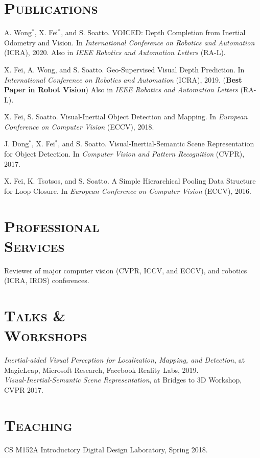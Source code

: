 \documentclass[margin, line, 10pt]{res} %
\begin{document}
\begin{resume}
\section{\textsc{Publications}}

\begin{enumerate}[label={[\bf\arabic*]},leftmargin=*]
\item
A. Wong$^*$, X. Fei$^*$, and S. Soatto. VOICED: Depth Completion from Inertial Odometry and Vision.
In \textit{International Conference on Robotics and Automation} (ICRA), 2020. Also in \textit{IEEE Robotics and Automation Letters} (RA-L).
\item 
X. Fei, A. Wong, and S. Soatto. Geo-Supervised Visual Depth Prediction. 
In \textit{International Conference on Robotics and Automation} (ICRA), 2019. 
(\textbf{Best Paper in Robot Vision})
Also in \textit{IEEE Robotics and Automation Letters} (RA-L).
\item 
X. Fei, S. Soatto. Visual-Inertial Object Detection and Mapping. 
In \textit{European Conference on Computer Vision} (ECCV), 2018.
\item 
J. Dong$^*$, X. Fei$^*$, and S. Soatto. Visual-Inertial-Semantic Scene Representation for Object Detection. 
In \textit{Computer Vision and Pattern Recognition} (CVPR), 2017.
\item 
X. Fei, K. Tsotsos, and S. Soatto. A Simple Hierarchical Pooling Data Structure for Loop Closure. 
In \textit{European Conference on Computer Vision} (ECCV), 2016.
\end{enumerate}

\section{\textsc{Professional\\Services}}
Reviewer of major computer vision (CVPR, ICCV, and ECCV), and robotics (ICRA, IROS) conferences.

\section{\textsc{Talks \&\\Workshops}}
\textit{Inertial-aided Visual Perception for Localization, Mapping, and Detection}, at MagicLeap, Microsoft Research, Facebook Reality Labs, 2019.\\
\textit{Visual-Inertial-Semantic Scene Representation}, at Bridges to 3D Workshop, CVPR 2017.

\section{\textsc{Teaching}}
CS M152A Introductory Digital Design Laboratory, Spring 2018.


\end{resume}
\end{document}
